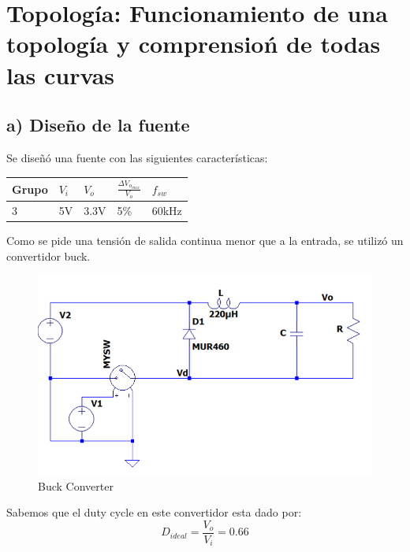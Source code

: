 \documentclass[e4_tp1_main.tex]{subfiles}
\begin{document}
\section{Topolog\'ia: Funcionamiento de una topolog\'ia y comprensio\'n de todas las curvas}

\subsection*{a) Diseño de la fuente} 

Se diseñ\'o una fuente con las siguientes caracter\'isticas:

\begin{table}[H]
\centering
\begin{tabular}{|l|l|l|l|l|}
\hline
\multicolumn{1}{|c|}{Grupo}  & $V_{i}$ & $V_{o}$  & $\frac{\Delta V_{o_{max}}}{V_o}$ & $f_{sw}$ \\ \hline
3     						& 5V     & 3.3V  & 5\%   & 60kHz  \\ \hline
\end{tabular}
\label{tabla:datos de la fuente}
\end{table} 



Como se pide una tensi\'on de salida continua menor que a la entrada, se utiliz\'o un convertidor buck. 


\begin{figure}[H]
  \centering
    \includegraphics[scale = 1]{Imagenes/punto2/Circuito}
  \caption{Buck Converter}
  \label{Circuito}
\end{figure}




Sabemos que el duty cycle en este convertidor esta dado por: 
$$D_{ideal}=\frac{V_o}{V_i}=0.66$$
\end{document}

